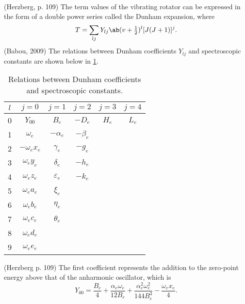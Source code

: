 \documentclass[11pt, twoside, fleqn]{report}
\begin{document}
    (Herzberg, p. 109)
    The term values of the vibrating rotator can be expressed in the form of a double power series called the Dunham expansion, where
    \begin{equation*}
        T = \sum_{lj}Y_{lj}\ab(v + \tfrac{1}{2})^l [J(J + 1)]^j.
    \end{equation*}
    (Babou, 2009)
    The relations between Dunham coefficients $Y_{lj}$ and spectroscopic constants are shown below in \cref{t:dunham_coefficients}.
    \begin{table}[H]
        \centering
        \caption{Relations between Dunham coefficients and spectroscopic constants.}
        \label{t:dunham_coefficients}
        \begin{tabular}{c|ccccc}
            \toprule
            $l$ & $j = 0$            & $j = 1$           & $j = 2$      & $j = 3$ & $j = 4$ \\
            \midrule
            0   & $Y_{00}$           & $B_e$           & $-D_e$     & $H_e$ & $L_e$ \\
            1   & $\omega_e$       & $-\alpha_e$     & $-\beta_e$ &         &         \\
            2   & $-\omega_ex_e$ & $\gamma_e$      & $-g_e$     &         &         \\
            3   & $\omega_ey_e$  & $\delta_e$      & $-h_e$     &         &         \\
            4   & $\omega_ez_e$  & $\varepsilon_e$ & $-k_e$     &         &         \\
            5   & $\omega_ea_e$  & $\xi_e$         &              &         &         \\
            6   & $\omega_eb_e$  & $\eta_e$        &              &         &         \\
            7   & $\omega_ec_e$  & $\theta_e$      &              &         &         \\
            8   & $\omega_ed_e$  &                   &              &         &         \\
            9   & $\omega_ee_e$  &                   &              &         &         \\
            \bottomrule
        \end{tabular}
    \end{table}
    (Herzberg p. 109)
    The first coefficient represents the addition to the zero-point energy above that of the anharmonic oscillator, which is
    \begin{equation*}
        Y_{00} = \frac{B_e}{4} + \frac{\alpha_e\omega_e}{12B_e} + \frac{\alpha_e^2\omega_e^2}{144B_e^3} - \frac{\omega_ex_e}{4}.
    \end{equation*}
\end{document}
